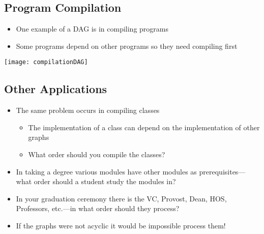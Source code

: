 
\begin{slide}
\section{Program Compilation}

\begin{PauseHighLight}
  \begin{itemize}
  \item One example of a DAG is in compiling programs\pause
  \item Some programs depend on other programs so they need compiling first\pause
  \end{itemize}
  \begin{center}
    \texttt{[image: compilationDAG]}
  \end{center}
\end{PauseHighLight}

\end{slide}


\begin{slide}
\section[-2]{Other Applications}

\begin{PauseHighLight}
  \begin{itemize}
  \item The same problem occurs in compiling classes
    \begin{itemize}
    \item The implementation of a class can depend on the implementation
      of other graphs\pause
    \item What order should you compile the classes?\pause
    \end{itemize}
  \item In taking a degree various modules have other modules as
    prerequisites\pause---what order should a student study the modules
    in?\pauseb
  \item In your graduation ceremony there is the VC, Provost, Dean, HOS,
    Professors, etc.\pause---in what order should they process?\pauseb 
  \item If the graphs were not acyclic it would be impossible process them!\pauseb
  \end{itemize}
\end{PauseHighLight}

\end{slide}

